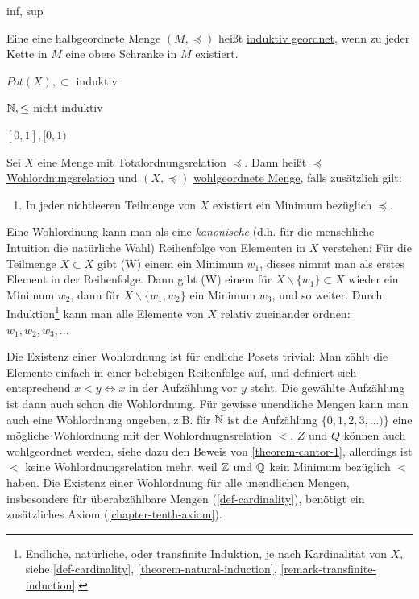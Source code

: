 \begin{example}
    inf, sup
\end{example}

\begin{definition}
     Eine eine halbgeordnete Menge $(M, \preceq)$ heißt \underline{induktiv geordnet}, wenn zu jeder Kette in $M$ eine obere Schranke in $M$ existiert.
\end{definition}

\begin{example}
    $Pot(X), \subset$ induktiv
    
    $\mathbb{N}, \leq$ nicht induktiv

    $[0, 1], [0, 1)$
\end{example}

\begin{definition}[Wohlordnungsrelation]
    Sei $X$ eine Menge mit Totalordnungsrelation $\preceq$. Dann heißt $\preceq$ \underline{Wohlordnungsrelation} und $(X, \preceq)$ \underline{wohlgeordnete Menge}, falls zusätzlich gilt:
    \begin{enumerate}[label=(W)]
        \item In jeder nichtleeren Teilmenge von $X$ existiert ein Minimum bezüglich $\preceq$.
    \end{enumerate}
\end{definition}

\begin{remark}
    Eine Wohlordnung kann man als eine \emph{kanonische} (d.h. für die menschliche Intuition die natürliche Wahl) Reihenfolge von Elementen in $X$ verstehen: Für die Teilmenge $X \subset X$ gibt (W) einem ein Minimum $w_1$, dieses nimmt man als erstes Element in der Reihenfolge. Dann gibt (W) einem für $X \backslash \{w_1\} \subset X$ wieder ein Minimum $w_2$, dann für $X \backslash \{w_1, w_2\}$ ein Minimum $w_3$, und so weiter. Durch Induktion\footnote{Endliche, natürliche, oder transfinite Induktion, je nach Kardinalität von $X$, siehe \ref{def-cardinality}, \ref{theorem-natural-induction}, \ref{remark-transfinite-induction}.} kann man alle Elemente von $X$ relativ zueinander ordnen: $w_1, w_2, w_3, ...$

    Die Existenz einer Wohlordnung ist für endliche Posets trivial: Man zählt die Elemente einfach in einer beliebigen Reihenfolge auf, und definiert sich entsprechend $x < y \iff x$ in der Aufzählung vor $y$ steht. Die gewählte Aufzählung ist dann auch schon die Wohlordnung. Für gewisse unendliche Mengen kann man auch eine Wohlordnung angeben, z.B. für $\mathbb{N}$ ist die Aufzählung $\{0, 1, 2, 3, ...)\}$ eine mögliche Wohlordnung mit der Wohlordnugnsrelation $<$. $Z$ und $Q$ können auch wohlgeordnet werden, siehe dazu den Beweis von \ref{theorem-cantor-1}, allerdings ist $<$ keine Wohlordnungsrelation mehr, weil $\mathbb{Z}$ und $\mathbb{Q}$ kein Minimum bezüglich $<$ haben. Die Existenz einer Wohlordnung für alle unendlichen Mengen, insbesondere für überabzählbare Mengen (\ref{def-cardinality}), benötigt ein zusätzliches Axiom (\ref{chapter-tenth-axiom}).
\end{remark}



